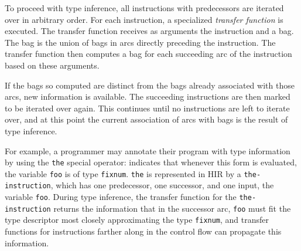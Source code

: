 To proceed with type inference, all instructions with predecessors are iterated over in arbitrary order. For each instruction, a specialized \textit{transfer function} is executed. The transfer function receives as arguments the instruction and a bag. The bag is the union of bags in arcs directly preceding the instruction. The transfer function then computes a bag for each succeeding arc of the instruction based on these arguments.

If the bags so computed are distinct from the bags already associated with those arcs, new information is available. The succeeding instructions are then marked to be iterated over again. This continues until no instructions are left to iterate over, and at this point the current association of arcs with bags is the result of type inference.

For example, a \commonlisp{} programmer may annotate their program with type information by using the \texttt{the} special operator:  indicates that whenever this form is evaluated, the variable \texttt{foo} is of type \texttt{fixnum}. \texttt{the} is represented in HIR by a \texttt{the-instruction}, which has one predecessor, one successor, and one input, the variable \texttt{foo}. During type inference, the transfer function for the \texttt{the-instruction} returns the information that in the successor arc, \texttt{foo} must fit the type descriptor most closely approximating the \commonlisp{} type \texttt{fixnum}, and transfer functions for instructions farther along in the control flow can propagate this information.
